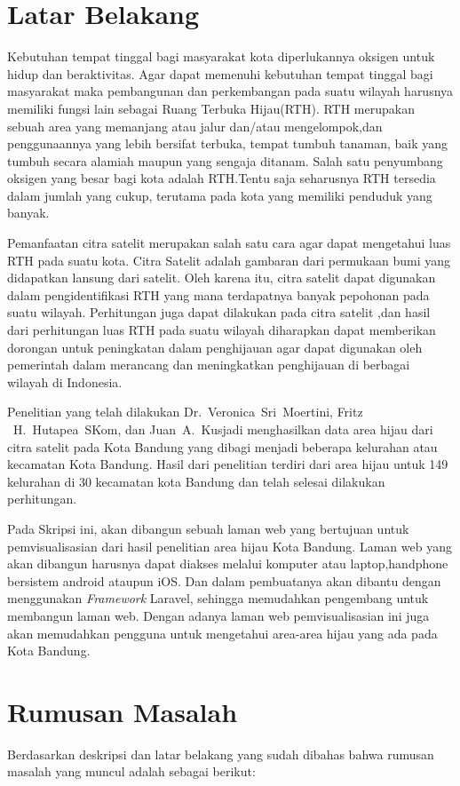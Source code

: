 \documentclass[a4paper,twoside]{article}
\begin{document}
\section{Latar Belakang}
Kebutuhan tempat tinggal bagi masyarakat kota diperlukannya oksigen untuk hidup dan beraktivitas. Agar dapat memenuhi kebutuhan tempat tinggal bagi masyarakat maka pembangunan dan perkembangan pada suatu wilayah harusnya memiliki fungsi lain sebagai Ruang Terbuka Hijau(RTH). RTH merupakan sebuah area yang memanjang atau jalur dan/atau mengelompok,dan penggunaannya yang lebih bersifat terbuka, tempat tumbuh tanaman, baik yang tumbuh secara alamiah maupun yang sengaja ditanam. Salah satu penyumbang oksigen yang besar bagi kota adalah RTH.Tentu saja seharusnya RTH tersedia dalam jumlah yang cukup, terutama pada kota yang memiliki penduduk yang banyak.

Pemanfaatan citra satelit merupakan salah satu cara agar dapat mengetahui luas RTH pada suatu kota. Citra Satelit adalah gambaran dari permukaan bumi yang didapatkan lansung dari satelit. Oleh karena itu, citra satelit dapat digunakan dalam pengidentifikasi RTH yang mana terdapatnya banyak pepohonan pada suatu wilayah. Perhitungan juga dapat dilakukan pada citra satelit ,dan hasil dari perhitungan luas RTH pada suatu wilayah diharapkan dapat memberikan dorongan untuk peningkatan dalam penghijauan agar dapat digunakan oleh pemerintah dalam merancang dan meningkatkan penghijauan di berbagai wilayah di Indonesia.

Penelitian yang telah dilakukan Dr.~Veronica~Sri~Moertini, Fritz ~H.~Hutapea~SKom, dan Juan~A.~Kusjadi
menghasilkan data area hijau dari citra satelit pada Kota Bandung yang dibagi menjadi beberapa kelurahan atau kecamatan Kota Bandung. Hasil dari penelitian terdiri dari area hijau untuk 149 kelurahan di 30 kecamatan kota Bandung dan telah selesai dilakukan perhitungan.

Pada Skripsi ini, akan dibangun sebuah laman web yang bertujuan untuk pemvisualisasian dari hasil penelitian area hijau Kota Bandung. Laman web yang akan dibangun harusnya dapat diakses melalui komputer atau laptop,handphone bersistem android ataupun iOS. Dan dalam pembuatanya akan dibantu dengan menggunakan \emph{Framework} Laravel, sehingga memudahkan pengembang untuk membangun laman web. Dengan adanya laman web pemvisualisasian ini juga akan memudahkan pengguna untuk mengetahui area-area hijau yang ada pada Kota Bandung.

\section{Rumusan Masalah}
Berdasarkan deskripsi dan latar belakang yang sudah dibahas bahwa rumusan masalah yang muncul adalah sebagai berikut:
\end{document}
